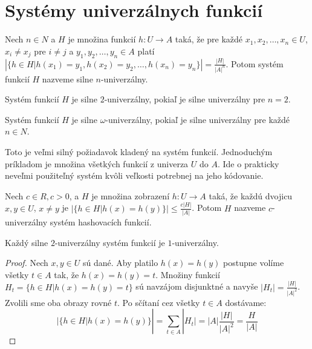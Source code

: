 \chapter{Systémy univerzálnych funkcií}


\begin{definition}
\label{strong_universal_n_system}
Nech $n \in N$ a $H$ je množina funkcií $h: U \rightarrow A$ taká, že pre každé $x_1, x_2, \dots, x_n \in U$, $x_i \neq x_j$ pre $i \neq j$ a $y_1, y_2, \dots, y_n \in A$ platí $\left|\lbrace h \in H | h(x_1) = y_1, h(x_2) = y_2, \dots, h(x_n) = y_n \rbrace \right| = \frac{|H|}{|A|^n}$. Potom systém funkcií $H$ nazveme silne $n$-univerzálny.
\end{definition}

\begin{definition}
\label{strong_universal_2_system}
Systém funkcií $H$ je silne $2$-univerzálny, pokiaľ je silne univerzálny pre $n = 2$.
\end{definition}

\begin{definition}
\label{strong_universal_omega_system}
Systém funkcií $H$ je silne $\omega$-univerzálny, pokiaľ je silne univerzálny pre každé $n \in N$.
\end{definition}

Toto je veľmi silný požiadavok kladený na systém funkcií. Jednoduchým prí\-kladom je množina všetkých funkcií z univerza $U$ do $A$. Ide o prakticky neveľmi použiteľný systém kvôli veľkosti potrebnej na jeho kódovanie. 

\begin{definition}
\label{c_universal_system}
Nech $c \in R, c > 0$, a $H$ je množina zobrazení $h: U \rightarrow A$ taká, že každú dvojicu $x, y \in U$, $x \neq y$ je $\left| \lbrace h \in H | h(x) = h(y) \rbrace \right| \leq \frac {c |H|}{|A|}$. Potom $H$ nazveme $c$-univerzálny systém hashovacích funkcií.
\end{definition}

\begin{remark}
Každý silne $2$-univerzálny systém funkcií je $1$-univerzálny.
\end{remark}
\begin{proof}
Nech $x, y \in U$ sú dané. Aby platilo $h(x) = h(y)$ postupne volíme všetky $t \in A$ tak, že $h(x) = h(y) = t$. Množiny funkcií $H_t = \lbrace h \in H | h(x) = h(y) = t \rbrace$ sú navzájom disjunktné a navyše $|H_t| = \frac{|H|}{{|A|}^{2}}$. Zvolili sme oba obrazy rovné $t$. Po sčítaní cez všetky $t \in A$ dostávame:
\begin{displaymath}
|\lbrace h \in H | h(x) = h(y) \rbrace | = \displaystyle \sum_{t \in A} |H_t| = |A| \frac{|H|}{{|A|}^{2}} = \frac{H}{|A|}
\end{displaymath}
\end{proof}

